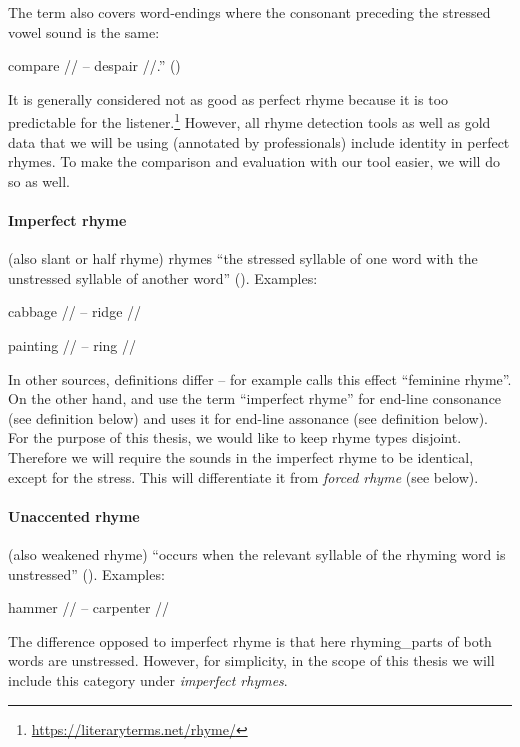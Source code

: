 The term also covers word‐endings where the consonant preceding the stressed vowel sound is the same: 

compare // -- despair //.'' (\cite{oxforddict2008literary})

It is generally considered not as good as perfect rhyme because it is too predictable for the listener.\footnote{\url{https://literaryterms.net/rhyme/}} However, all rhyme detection tools as well as gold data that we will be using (annotated by professionals) include identity in perfect rhymes. To make the comparison and evaluation with our tool easier, we will do so as well.

\paragraph{Imperfect rhyme} (also slant or half rhyme)  rhymes ``the stressed syllable of one word with the unstressed syllable of another word'' (\cite{bergman2017litcharts}). Examples: 

cabbage // -- ridge //

painting // -- ring //

\noindent In other sources, definitions differ -- for example \cite{literarydevices2020} calls this effect ``feminine rhyme''.  On the other hand, \cite{oxforddict2008literary} and \cite{britannica} use the term ``imperfect rhyme'' for end-line consonance (see definition below) and \cite{vanphonological} uses it for end-line assonance (see definition below). For the purpose of this thesis, we would like to keep rhyme types disjoint. Therefore we will require the sounds in the imperfect rhyme to be identical, except for the stress. This will differentiate it from \textit{forced rhyme} (see below).


\paragraph{Unaccented rhyme} (also weakened rhyme) ``occurs when the relevant syllable of the rhyming word is unstressed'' (\cite{britannica}). Examples: 

hammer // -- carpenter //

\noindent The difference opposed to imperfect rhyme is that here \gls{rhyming_part}s of both words are unstressed. However, for simplicity, in the scope of this thesis we will include this category under \textit{imperfect rhymes}.



